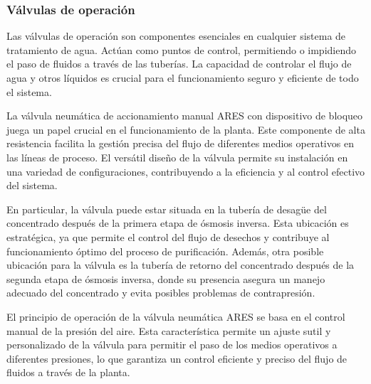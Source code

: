 \subsubsection{Válvulas de operación} \label{sec:valvula_multi}

Las válvulas de operación son componentes esenciales en cualquier sistema de tratamiento de agua. Actúan como puntos de control, permitiendo o impidiendo el paso de fluidos a través de las tuberías. La capacidad de controlar el flujo de agua y otros líquidos es crucial para el funcionamiento seguro y eficiente de todo el sistema.

La válvula neumática de accionamiento manual ARES con dispositivo de bloqueo juega un papel crucial en el funcionamiento de la planta. Este componente de alta resistencia facilita la gestión precisa del flujo de diferentes medios operativos en las líneas de proceso. El versátil diseño de la válvula permite su instalación en una variedad de configuraciones, contribuyendo a la eficiencia y al control efectivo del sistema.

En particular, la válvula puede estar situada en la tubería de desagüe del concentrado después de la primera etapa de ósmosis inversa. Esta ubicación es estratégica, ya que permite el control del flujo de desechos y contribuye al funcionamiento óptimo del proceso de purificación. Además, otra posible ubicación para la válvula es la tubería de retorno del concentrado después de la segunda etapa de ósmosis inversa, donde su presencia asegura un manejo adecuado del concentrado y evita posibles problemas de contrapresión.

El principio de operación de la válvula neumática ARES se basa en el control manual de la presión del aire. Esta característica permite un ajuste sutil y personalizado de la válvula para permitir el paso de los medios operativos a diferentes presiones, lo que garantiza un control eficiente y preciso del flujo de fluidos a través de la planta.



